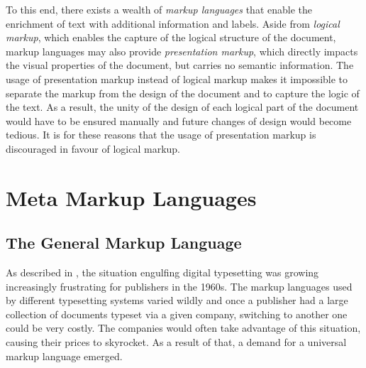 \documentclass{book}
\begin{document}
      To this end, there exists a wealth of \emph{markup languages} that enable
      the enrichment of text with additional information and labels. Aside from
      \emph{logical markup}, which enables the capture of the logical structure
      of the document, markup languages may also provide \emph{presentation
      markup}, which directly impacts the visual properties of the document, but
      carries no semantic information. The usage of presentation markup instead
      of logical markup makes it impossible to separate the markup from the
      design of the document and to capture the logic of the text. As a result,
      the unity of the design of each logical part of the document would have to
      be ensured manually and future changes of design would become tedious. It
      is for these reasons that the usage of presentation markup is discouraged
      in favour of logical markup.

      \section{Meta Markup Languages}
      \subsection{The General Markup Language}
        As described in \cite{hlava11}, the situation engulfing digital
        typesetting was growing increasingly frustrating for publishers in the
        1960s. The markup languages used by different typesetting systems varied
        wildly and once a publisher had a large collection of documents typeset
        via a given company, switching to another one could be very costly. The
        companies would often take advantage of this situation, causing their
        prices to skyrocket. As a result of that, a demand for a universal
        markup language emerged.
\end{document}
